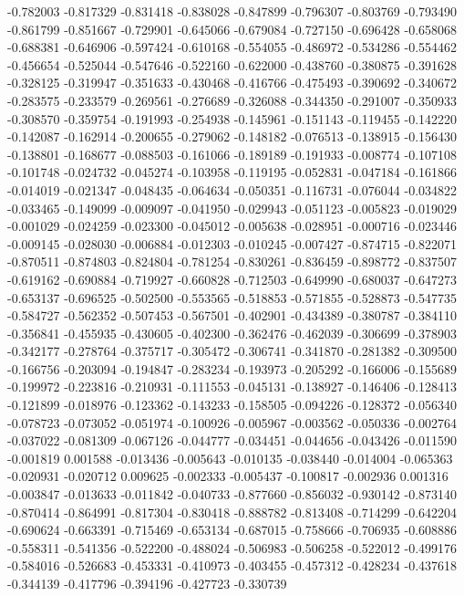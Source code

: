-0.782003
-0.817329
-0.831418
-0.838028
-0.847899
-0.796307
-0.803769
-0.793490
-0.861799
-0.851667
-0.729901
-0.645066
-0.679084
-0.727150
-0.696428
-0.658068
-0.688381
-0.646906
-0.597424
-0.610168
-0.554055
-0.486972
-0.534286
-0.554462
-0.456654
-0.525044
-0.547646
-0.522160
-0.622000
-0.438760
-0.380875
-0.391628
-0.328125
-0.319947
-0.351633
-0.430468
-0.416766
-0.475493
-0.390692
-0.340672
-0.283575
-0.233579
-0.269561
-0.276689
-0.326088
-0.344350
-0.291007
-0.350933
-0.308570
-0.359754
-0.191993
-0.254938
-0.145961
-0.151143
-0.119455
-0.142220
-0.142087
-0.162914
-0.200655
-0.279062
-0.148182
-0.076513
-0.138915
-0.156430
-0.138801
-0.168677
-0.088503
-0.161066
-0.189189
-0.191933
-0.008774
-0.107108
-0.101748
-0.024732
-0.045274
-0.103958
-0.119195
-0.052831
-0.047184
-0.161866
-0.014019
-0.021347
-0.048435
-0.064634
-0.050351
-0.116731
-0.076044
-0.034822
-0.033465
-0.149099
-0.009097
-0.041950
-0.029943
-0.051123
-0.005823
-0.019029
-0.001029
-0.024259
-0.023300
-0.045012
-0.005638
-0.028951
-0.000716
-0.023446
-0.009145
-0.028030
-0.006884
-0.012303
-0.010245
-0.007427
-0.874715
-0.822071
-0.870511
-0.874803
-0.824804
-0.781254
-0.830261
-0.836459
-0.898772
-0.837507
-0.619162
-0.690884
-0.719927
-0.660828
-0.712503
-0.649990
-0.680037
-0.647273
-0.653137
-0.696525
-0.502500
-0.553565
-0.518853
-0.571855
-0.528873
-0.547735
-0.584727
-0.562352
-0.507453
-0.567501
-0.402901
-0.434389
-0.380787
-0.384110
-0.356841
-0.455935
-0.430605
-0.402300
-0.362476
-0.462039
-0.306699
-0.378903
-0.342177
-0.278764
-0.375717
-0.305472
-0.306741
-0.341870
-0.281382
-0.309500
-0.166756
-0.203094
-0.194847
-0.283234
-0.193973
-0.205292
-0.166006
-0.155689
-0.199972
-0.223816
-0.210931
-0.111553
-0.045131
-0.138927
-0.146406
-0.128413
-0.121899
-0.018976
-0.123362
-0.143233
-0.158505
-0.094226
-0.128372
-0.056340
-0.078723
-0.073052
-0.051974
-0.100926
-0.005967
-0.003562
-0.050336
-0.002764
-0.037022
-0.081309
-0.067126
-0.044777
-0.034451
-0.044656
-0.043426
-0.011590
-0.001819
0.001588
-0.013436
-0.005643
-0.010135
-0.038440
-0.014004
-0.065363
-0.020931
-0.020712
0.009625
-0.002333
-0.005437
-0.100817
-0.002936
0.001316
-0.003847
-0.013633
-0.011842
-0.040733
-0.877660
-0.856032
-0.930142
-0.873140
-0.870414
-0.864991
-0.817304
-0.830418
-0.888782
-0.813408
-0.714299
-0.642204
-0.690624
-0.663391
-0.715469
-0.653134
-0.687015
-0.758666
-0.706935
-0.608886
-0.558311
-0.541356
-0.522200
-0.488024
-0.506983
-0.506258
-0.522012
-0.499176
-0.584016
-0.526683
-0.453331
-0.410973
-0.403455
-0.457312
-0.428234
-0.437618
-0.344139
-0.417796
-0.394196
-0.427723
-0.330739
